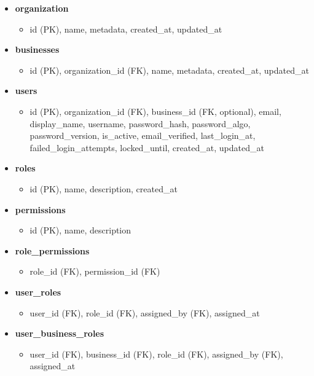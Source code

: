 \documentclass[]{VUMIFTemplateClass}
\begin{document}
\begin{itemize}
    \item \textbf{organization}  
    \begin{itemize}
        \item id (PK), name, metadata, created\_at, updated\_at
    \end{itemize}
    \item \textbf{businesses}  
    \begin{itemize}
        \item id (PK), organization\_id (FK), name, metadata, created\_at, updated\_at
    \end{itemize}
    \item \textbf{users}  
    \begin{itemize}
        \item id (PK), organization\_id (FK), business\_id (FK, optional), email, display\_name, username, 
        password\_hash, password\_algo, password\_version, is\_active, email\_verified, last\_login\_at, 
        failed\_login\_attempts, locked\_until, created\_at, updated\_at
    \end{itemize}
    \item \textbf{roles}  
    \begin{itemize}
        \item id (PK), name, description, created\_at
    \end{itemize}
    \item \textbf{permissions}  
    \begin{itemize}
        \item id (PK), name, description
    \end{itemize}
    \item \textbf{role\_permissions}  
    \begin{itemize}
        \item role\_id (FK), permission\_id (FK)
    \end{itemize}
    \item \textbf{user\_roles}  
    \begin{itemize}
        \item user\_id (FK), role\_id (FK), assigned\_by (FK), assigned\_at
    \end{itemize}
    \item \textbf{user\_business\_roles}  
    \begin{itemize}
        \item user\_id (FK), business\_id (FK), role\_id (FK), assigned\_by (FK), assigned\_at

\end{itemize}
\end{itemize}
\end{document}
